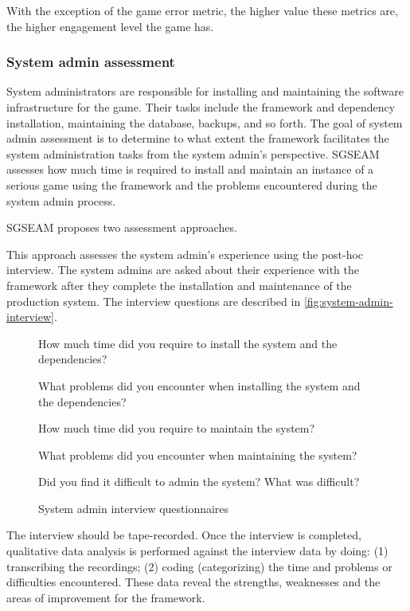 With the exception of the game error metric, the higher value these metrics are, the higher engagement 
level the game has.

\subsubsection{System admin assessment}

System administrators are responsible for installing and maintaining the software infrastructure
for the game. Their tasks include the framework and dependency installation, maintaining the database, 
backups, and so forth. The goal of system admin assessment is to determine to what extent the 
framework facilitates the system administration tasks from the system admin's perspective. SGSEAM 
assesses how much time is required to install and maintain an instance of a serious game using the 
framework and the problems encountered  during the system admin process.
 
SGSEAM proposes two assessment approaches.

\label{Post-hoc system admin interview}

This approach assesses the system admin's experience using the post-hoc interview. The system admins 
are asked about their experience with the framework after they complete the installation and maintenance
 of the production system. The interview questions are described in \autoref{fig:system-admin-interview}.

\begin{figure}[ht!]
\begin{mybox}
\begin{compactenum}
\item How much time did you require to install the system and the dependencies?
\item What problems did you encounter when installing the system and the dependencies?
\item How much time did you require to maintain the system?
\item What problems did you encounter when maintaining the system?
\item Did you find it difficult to admin the system? What was difficult?
\end{compactenum}
\end{mybox}
\caption{System admin interview questionnaires}
\label{fig:system-admin-interview}  
\end{figure}

The interview should be tape-recorded. Once the interview is completed, qualitative data
analysis is performed against the interview data by doing: (1) transcribing the recordings; 
(2) coding (categorizing) the time and problems or difficulties encountered. These data reveal the 
strengths, weaknesses and the areas of improvement for the framework.

